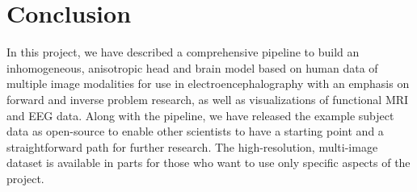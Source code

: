 %
%

\section{Conclusion}
\label{sec:Conclusion}


In this project, we have described a comprehensive pipeline to build an inhomogeneous, anisotropic head and brain model based on human data of multiple image modalities for use in electroencephalography with an emphasis on forward and inverse problem research, as well as visualizations of functional MRI and EEG data. Along with the pipeline, we have released the example subject data as open-source to enable other scientists to have a starting point and a straightforward path for further research. The high-resolution, multi-image dataset is available in parts for those who want to use only specific aspects of the project.
